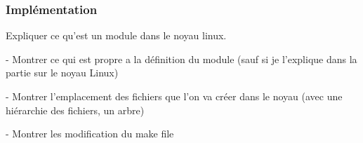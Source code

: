 \subsubsection{Implémentation}

Expliquer ce qu'est un module dans le noyau linux.

    - Montrer ce qui est propre a la définition du module (sauf si je l'explique dans la partie sur le noyau Linux)
    
    - Montrer l'emplacement des fichiers que l'on va créer dans le noyau (avec une hiérarchie des fichiers, un arbre)

    - Montrer les modification du make file



%    
